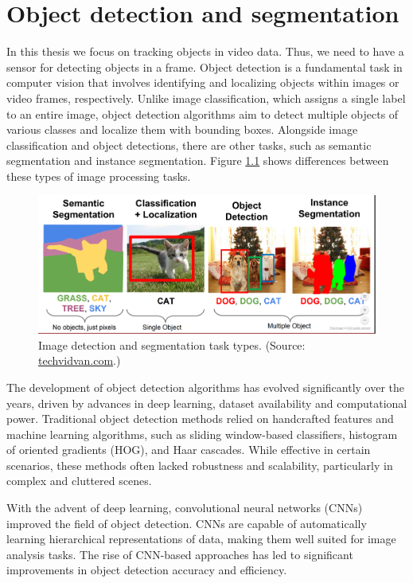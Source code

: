 \chapter{Object detection and segmentation}
In this thesis we focus on tracking objects in video data. Thus, we need to have a sensor for detecting objects in a
frame. Object detection is a fundamental task in computer vision that involves identifying and localizing objects
within images or video frames, respectively. Unlike image classification, which assigns a single label to an entire
image, object
detection algorithms aim to detect multiple objects of various classes and localize them with bounding boxes.
Alongside image classification and object detections, there are other tasks, such as semantic segmentation and
instance segmentation. Figure \ref{fig:seg_type} shows differences between these types of image processing tasks.

\begin{figure}
  \centering
  \includegraphics[width=\linewidth]{text/chapter_03/imgs/segmentation-types}
  \caption{Image detection and segmentation task types. (Source: \href{https://techvidvan.com/tutorials/image-segmentation-machine-learning/}{techvidvan.com}.)}
  \label{fig:seg_type}
\end{figure}

The development of object detection algorithms has evolved significantly over the years, driven by advances in deep
learning, dataset availability and computational power. Traditional object detection methods relied on handcrafted
features and machine learning algorithms, such as sliding window-based classifiers, histogram of oriented gradients (HOG), and Haar cascades. While effective in certain scenarios, these methods often lacked robustness and scalability, particularly in complex and cluttered scenes.

With the advent of deep learning, convolutional neural networks (CNNs) improved the field of object detection. CNNs are
capable of automatically learning hierarchical representations of data, making them well suited for image analysis
tasks. The rise of CNN-based approaches has led to significant improvements in object detection accuracy and efficiency.

